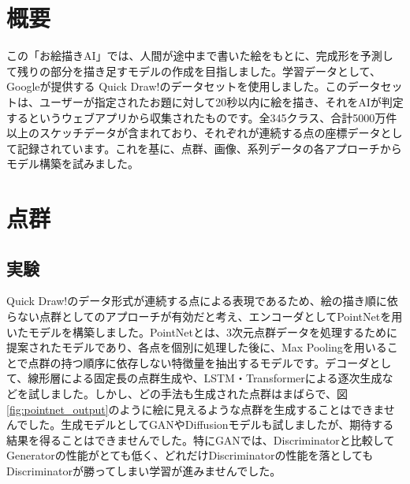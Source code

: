 \section{概要}

この「お絵描きAI」では、人間が途中まで書いた絵をもとに、完成形を予測して残りの部分を描き足すモデルの作成を目指しました。学習データとして、Googleが提供する Quick Draw!\cite{quickdraw}のデータセットを使用しました。このデータセットは、ユーザーが指定されたお題に対して20秒以内に絵を描き、それをAIが判定するというウェブアプリから収集されたものです。全345クラス、合計5000万件以上のスケッチデータが含まれており、それぞれが連続する点の座標データとして記録されています。これを基に、点群、画像、系列データの各アプローチからモデル構築を試みました。

\section{点群}
\subsection{実験}
Quick Draw!\cite{quickdraw}のデータ形式が連続する点による表現であるため、絵の描き順に依らない点群としてのアプローチが有効だと考え、エンコーダとしてPointNet\cite{pointnet}を用いたモデルを構築しました。PointNet\cite{pointnet}とは、3次元点群データを処理するために提案されたモデルであり、各点を個別に処理した後に、Max Poolingを用いることで点群の持つ順序に依存しない特徴量を抽出するモデルです。デコーダとして、線形層による固定長の点群生成や、LSTM・Transformerによる逐次生成などを試しました。しかし、どの手法も生成された点群はまばらで、図\ref{fig:pointnet_output}のように絵に見えるような点群を生成することはできませんでした。生成モデルとしてGANやDiffusionモデルも試しましたが、期待する結果を得ることはできませんでした。特にGANでは、Discriminatorと比較してGeneratorの性能がとても低く、どれだけDiscriminatorの性能を落としてもDiscriminatorが勝ってしまい学習が進みませんでした。

